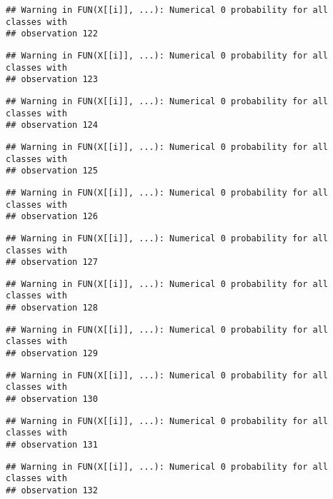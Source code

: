 \documentclass[
]{article}
\begin{document}
\begin{verbatim}
## Warning in FUN(X[[i]], ...): Numerical 0 probability for all classes with
## observation 122
\end{verbatim}

\begin{verbatim}
## Warning in FUN(X[[i]], ...): Numerical 0 probability for all classes with
## observation 123
\end{verbatim}

\begin{verbatim}
## Warning in FUN(X[[i]], ...): Numerical 0 probability for all classes with
## observation 124
\end{verbatim}

\begin{verbatim}
## Warning in FUN(X[[i]], ...): Numerical 0 probability for all classes with
## observation 125
\end{verbatim}

\begin{verbatim}
## Warning in FUN(X[[i]], ...): Numerical 0 probability for all classes with
## observation 126
\end{verbatim}

\begin{verbatim}
## Warning in FUN(X[[i]], ...): Numerical 0 probability for all classes with
## observation 127
\end{verbatim}

\begin{verbatim}
## Warning in FUN(X[[i]], ...): Numerical 0 probability for all classes with
## observation 128
\end{verbatim}

\begin{verbatim}
## Warning in FUN(X[[i]], ...): Numerical 0 probability for all classes with
## observation 129
\end{verbatim}

\begin{verbatim}
## Warning in FUN(X[[i]], ...): Numerical 0 probability for all classes with
## observation 130
\end{verbatim}

\begin{verbatim}
## Warning in FUN(X[[i]], ...): Numerical 0 probability for all classes with
## observation 131
\end{verbatim}

\begin{verbatim}
## Warning in FUN(X[[i]], ...): Numerical 0 probability for all classes with
## observation 132
\end{verbatim}
\end{document}
